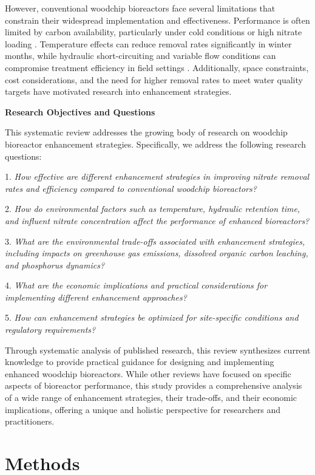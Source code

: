 \documentclass[12pt,a4paper]{article}
\begin{document}
However, conventional woodchip bioreactors face several limitations that constrain their widespread implementation and effectiveness. Performance is often limited by carbon availability, particularly under cold conditions or high nitrate loading \citep{RN625, RN228, RN258}. Temperature effects can reduce removal rates significantly in winter months, while hydraulic short-circuiting and variable flow conditions can compromise treatment efficiency in field settings \citep{RN228, RN309}. Additionally, space constraints, cost considerations, and the need for higher removal rates to meet water quality targets have motivated research into enhancement strategies.

\textbf{Research Objectives and Questions}

This systematic review addresses the growing body of research on woodchip bioreactor enhancement strategies. Specifically, we address the following research questions:

1. \textit{How effective are different enhancement strategies in improving nitrate removal rates and efficiency compared to conventional woodchip bioreactors?}

2. \textit{How do environmental factors such as temperature, hydraulic retention time, and influent nitrate concentration affect the performance of enhanced bioreactors?}

3. \textit{What are the environmental trade-offs associated with enhancement strategies, including impacts on greenhouse gas emissions, dissolved organic carbon leaching, and phosphorus dynamics?}

4. \textit{What are the economic implications and practical considerations for implementing different enhancement approaches?}

5. \textit{How can enhancement strategies be optimized for site-specific conditions and regulatory requirements?}

Through systematic analysis of published research, this review synthesizes current knowledge to provide practical guidance for designing and implementing enhanced woodchip bioreactors. While other reviews have focused on specific aspects of bioreactor performance, this study provides a comprehensive analysis of a wide range of enhancement strategies, their trade-offs, and their economic implications, offering a unique and holistic perspective for researchers and practitioners.

\section{Methods}
\end{document}
